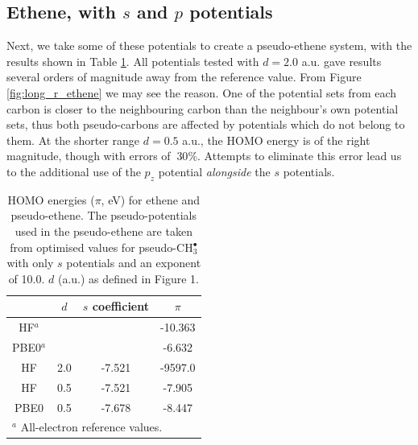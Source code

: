 \documentclass[aip]{revtex4-1}
\begin{document}
\subsection*{Ethene, with \(s\) and \(p\) potentials}

Next, we take some of these potentials to create a pseudo-ethene system, with the results shown in Table \ref{table:ethene_s_pseudo}. All potentials tested with \(d = 2.0\) a.u. gave results several orders of magnitude away from the reference value. From Figure \ref{fig:long_r_ethene} we may see the reason. One of the potential sets from each carbon is closer to the neighbouring carbon than the neighbour's own potential sets, thus both pseudo-carbons are affected by potentials which do not belong to them. At the shorter range \(d = 0.5\) a.u., the HOMO energy is of the right magnitude, though with errors of \(~ 30\%\). Attempts to eliminate this error lead us to the additional use of the \(p_{z}\) potential \textit{alongside} the \(s\) potentials.

\begin{table}[ht]
\begin{tabular}{c c c c}
\hline\hline
& $d$ & \(s\) coefficient & \( \pi \)  \\
\hline
HF$^a$   &     &        & -10.363 \\
PBE0$^a$ &     &        & -6.632 \\
HF       & 2.0 & -7.521 & -9597.0 \\
HF       & 0.5 & -7.521  & -7.905 \\
PBE0     & 0.5 &-7.678  & -8.447 \\
\hline\hline
\multicolumn{4}{l}{$^a$ All-electron reference values.}\\
\end{tabular}
\caption{HOMO energies ($\pi$, eV) for ethene and pseudo-ethene. The pseudo-potentials used in the pseudo-ethene are taken from optimised values for 
pseudo-CH\(^{\bullet}_{3}\) with only \(s\) potentials and an exponent of 10.0. $d$ (a.u.) as defined 
in Figure 1.}
\label{table:ethene_s_pseudo}
\end{table}
\end{document}
